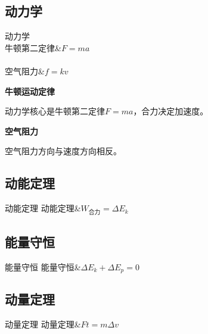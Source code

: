 \subsection{动力学}
\begin{formulatab}{动力学}
  \\
  牛顿第二定律&$F=ma$\\
  \\
  空气阻力&$f=kv$\\
\end{formulatab}

\textbf{牛顿运动定律}

动力学核心是牛顿第二定律$F=ma$，合力决定加速度。

\textbf{空气阻力}

空气阻力方向与速度方向相反。

\subsection{动能定理}
\begin{formulatab}{动能定理}
  动能定理&$W_{\text{合力}}=\Delta E_k$\\
\end{formulatab}

\subsection{能量守恒}
\begin{formulatab}{能量守恒}
  能量守恒&$\Delta E_k+\Delta E_p=0$\\
\end{formulatab}

\subsection{动量定理}
\begin{formulatab}{动量定理}
  动量定理&$Ft=m\Delta v$\\
\end{formulatab}
